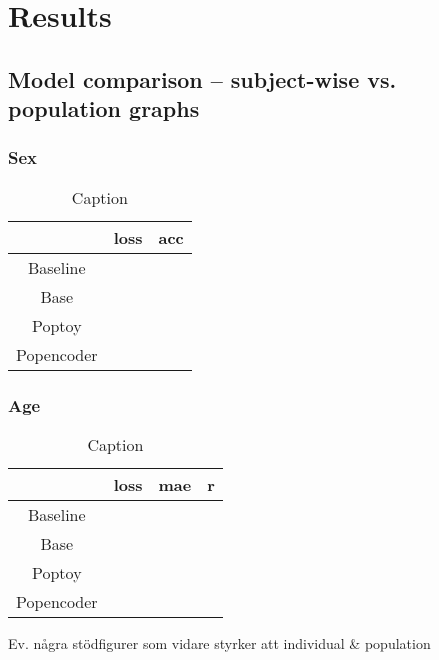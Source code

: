 \chapter{Results}

\section{Model comparison -- subject-wise vs. population graphs}

\subsection{Sex}

\begin{table}[H]
    \centering
    \begin{tabular}{c|c|c}
         &  loss & acc \\ \hline
        Baseline & & \\
        Base & &\\
        Poptoy & &\\
        Popencoder & &\\
    \end{tabular}
    \caption{Caption}
    \label{tab:my_label}
\end{table}

\subsection{Age}
\begin{table}[H]
    \centering
    \begin{tabular}{c|c|c|c}
         &  loss & mae & r \\ \hline 
        Baseline & &\\
        Base & &\\
        Poptoy & &\\
        Popencoder & &\\
    \end{tabular}
    \caption{Caption}
    \label{tab:my_label}
\end{table}

Ev. några stödfigurer som vidare styrker att individual & population 


